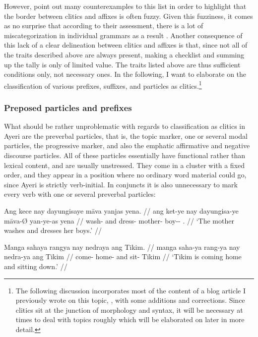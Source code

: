 However, \citet{spencerluis2012} point out many counterexamples to this list in
order to highlight that the border between clitics and affixes is often fuzzy.
Given this fuzziness, it comes as no surprise that according to their
assessment, there is a lot of miscategorization in individual grammars as a
result \citep[107]{spencerluis2012}. Another consequence of this lack of a
clear delineation between clitics and affixes is that, since not all of the
traits described above are always present, making a checklist and summing up
the tally is only of limited value. The traits listed above are thus sufficient
conditions only, not necessary ones. In the following, I want to elaborate on
the classification of various prefixes, suffixes, and particles as
clitics.\footnote{The following discussion incorporates most of the content of
a blog article I previously wrote on this topic, \citet{benung:clitics}, with
some additions and corrections. Since clitics sit at the junction of morphology
and syntax, it will be necessary at times to deal with topics roughly which
will be elaborated on later in more detail.}

\subsubsection{Preposed particles and prefixes}

What should be rather unproblematic with regards to classification as clitics
in Ayeri are the preverbal particles, that is, the topic marker, one or several
modal particles, the progressive marker, and also the emphatic affirmative and
negative discourse particles. All of these particles essentially have
functional rather than lexical content, and are usually unstressed. They come
in a cluster with a fixed order, and they appear in a position where no
ordinary word material could go, since Ayeri is strictly verb-initial. In
conjuncts it is also unnecessary to mark every verb with one or several
preverbal particles:

\pex
\a\label{ex:clitics_1a}\begingl
	\gla Ang kece nay dayungisaye māva yanjas yena. //
	\glb ang ket-ye nay dayungisa-ye māva-Ø yan-ye-as yena //
	\glc \AgtT{} wash-\TsgF{} and dress-\TsgF{} mother-\Top{} boy-\Pl{}-\Parg{}
		\TsgF{}.\Gen{} //
	\glft `The mother washes and dresses her boys.' //
\endgl

\a\label{ex:clitics_1b}\begingl
	\gla Manga sahaya rangya nay nedraya ang Tikim. //
	\glb manga saha-ya rang-ya nay nedra-ya ang Tikim //
	\glc \Prog{} come-\TsgM{} home-\Loc{} and sit-\TsgM{} \Aarg{} Tikim //
	\glft `Tikim is coming home and sitting down.' //
\endgl

